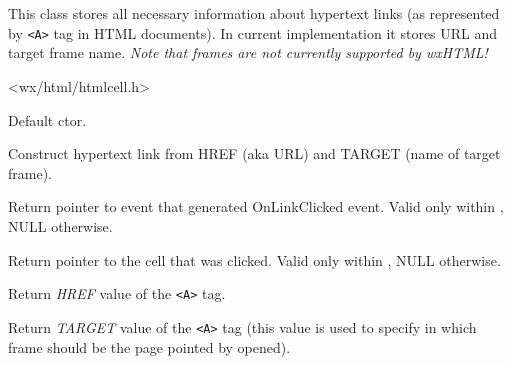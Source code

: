 \section{}\label{wxhtmllinkinfo}

This class stores all necessary information about hypertext
links (as represented by {\tt <A>} tag in HTML documents). In 
current implementation it stores URL and target frame name. 
{\it Note that frames are not currently supported by wxHTML!}




<wx/html/htmlcell.h>


\label{wxhtmllinkinfowxhtmllinkinfo}


Default ctor.


Construct hypertext link from HREF (aka URL) and TARGET (name of target
frame).

\label{wxhtmllinkinfogetevent}


Return pointer to event that generated OnLinkClicked event. Valid
only within ,
NULL otherwise.

\label{wxhtmllinkinfogethtmlcell}


Return pointer to the cell that was clicked. Valid
only within ,
NULL otherwise.


\label{wxhtmllinkinfogethref}


Return {\it HREF} value of the {\tt <A>} tag.

\label{wxhtmllinkinfogettarget}


Return {\it TARGET} value of the {\tt <A>} tag (this value
is used to specify in which frame should be the page pointed
by  opened).

